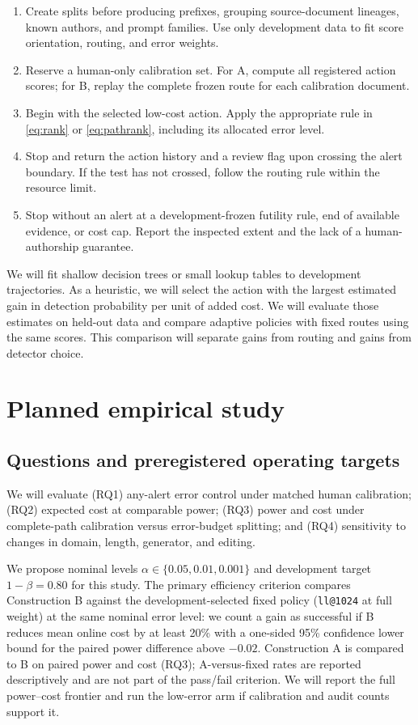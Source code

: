 \documentclass[pdflatex,sn-mathphys-num]{sn-jnl}
\begin{document}
\begin{enumerate}
\item Create splits before producing prefixes, grouping source-document lineages, known authors, and prompt families. Use only development data to fit score orientation, routing, and error weights.
\item Reserve a human-only calibration set. For A, compute all registered action scores; for B, replay the complete frozen route for each calibration document.
\item Begin with the selected low-cost action. Apply the appropriate rule in \eqref{eq:rank} or \eqref{eq:pathrank}, including its allocated error level.
\item Stop and return the action history and a review flag upon crossing the alert boundary. If the test has not crossed, follow the routing rule within the resource limit.
\item Stop without an alert at a development-frozen futility rule, end of available evidence, or cost cap. Report the inspected extent and the lack of a human-authorship guarantee.
\end{enumerate}

We will fit shallow decision trees or small lookup tables to development trajectories. As a heuristic, we will select the action with the largest estimated gain in detection probability per unit of added cost. We will evaluate those estimates on held-out data and compare adaptive policies with fixed routes using the same scores. This comparison will separate gains from routing and gains from detector choice.

\section{Planned empirical study}\label{sec:experiments}

\subsection{Questions and preregistered operating targets}

We will evaluate (RQ1) any-alert error control under matched human calibration; (RQ2) expected cost at comparable power; (RQ3) power and cost under complete-path calibration versus error-budget splitting; and (RQ4) sensitivity to changes in domain, length, generator, and editing.

We propose nominal levels \(\alpha\in\{0.05,0.01,0.001\}\) and development target \(1-\beta=0.80\) for this study. The primary efficiency criterion compares Construction B against the development-selected fixed policy (\texttt{ll@1024} at full weight) at the same nominal error level: we count a gain as successful if B reduces mean online cost by at least 20\% with a one-sided 95\% confidence lower bound for the paired power difference above \(-0.02\). Construction A is compared to B on paired power and cost (RQ3); A-versus-fixed rates are reported descriptively and are not part of the pass/fail criterion. We will report the full power--cost frontier and run the low-error arm if calibration and audit counts support it.
\end{document}
